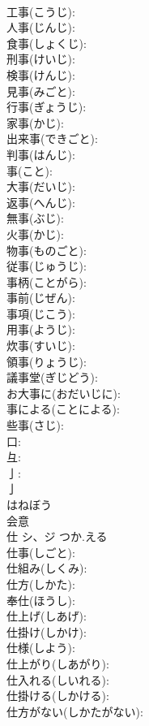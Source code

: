 \documentclass[8pt]{extreport}
\begin{document}
\begin{CJK}{UTF8}{min}
\\	工事(こうじ): 
\\	人事(じんじ): 
\\	食事(しょくじ): 
\\	刑事(けいじ): 
\\	検事(けんじ): 
\\	見事(みごと): 
\\	行事(ぎょうじ): 
\\	家事(かじ): 
\\	出来事(できごと): 
\\	判事(はんじ): 
\\	事(こと): 
\\	大事(だいじ): 
\\	返事(へんじ): 
\\	無事(ぶじ): 
\\	火事(かじ): 
\\	物事(ものごと): 
\\	従事(じゅうじ): 
\\	事柄(ことがら): 
\\	事前(じぜん): 
\\	事項(じこう): 
\\	用事(ようじ): 
\\	炊事(すいじ): 
\\	領事(りょうじ): 
\\	議事堂(ぎじどう): 
\\	お大事に(おだいじに): 
\\	事による(ことによる): 
\\	些事(さじ): 
\\	口: 
\\	彑: 
\\	亅: 
\\	亅	
\\	はねぼう	
\\	会意 
\\	仕	シ、ジ	つか.える		
\\	仕事(しごと): 
\\	仕組み(しくみ): 
\\	仕方(しかた): 
\\	奉仕(ほうし): 
\\	仕上げ(しあげ): 
\\	仕掛け(しかけ): 
\\	仕様(しよう): 
\\	仕上がり(しあがり): 
\\	仕入れる(しいれる): 
\\	仕掛ける(しかける): 
\\	仕方がない(しかたがない): 

\end{CJK}
\end{document}
